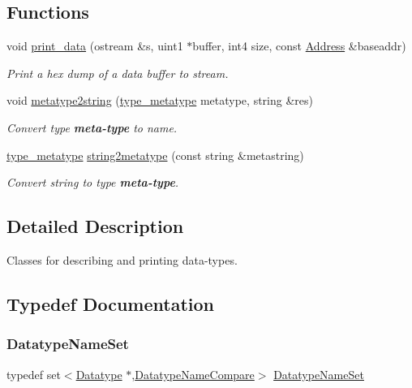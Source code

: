 \subsection*{Functions}
\begin{DoxyCompactItemize}
\item 
void \mbox{\hyperlink{type_8hh_a796dc3d5c66a81c95642a224e24ddb46}{print\+\_\+data}} (ostream \&s, uint1 $\ast$buffer, int4 size, const \mbox{\hyperlink{class_address}{Address}} \&baseaddr)
\begin{DoxyCompactList}\small\item\em Print a hex dump of a data buffer to stream. \end{DoxyCompactList}\item 
void \mbox{\hyperlink{type_8hh_ab61b3376ec08add3c7e899d703d5f34e}{metatype2string}} (\mbox{\hyperlink{type_8hh_aef6429f2523cdf4d415ba04a0209e61f}{type\+\_\+metatype}} metatype, string \&res)
\begin{DoxyCompactList}\small\item\em Convert type {\bfseries{meta-\/type}} to name. \end{DoxyCompactList}\item 
\mbox{\hyperlink{type_8hh_aef6429f2523cdf4d415ba04a0209e61f}{type\+\_\+metatype}} \mbox{\hyperlink{type_8hh_ae2f04f32a572d784b4c46f6745239c42}{string2metatype}} (const string \&metastring)
\begin{DoxyCompactList}\small\item\em Convert string to type {\bfseries{meta-\/type}}. \end{DoxyCompactList}\end{DoxyCompactItemize}


\subsection{Detailed Description}
Classes for describing and printing data-\/types. 



\subsection{Typedef Documentation}
\mbox{\label{type_8hh_aa1db0a143363e2b1d1150e3f2168c3ea}} 
\subsubsection{\texorpdfstring{DatatypeNameSet}{DatatypeNameSet}}
{\footnotesize\ttfamily typedef set$<$\mbox{\hyperlink{class_datatype}{Datatype}} $\ast$,\mbox{\hyperlink{struct_datatype_name_compare}{Datatype\+Name\+Compare}}$>$ \mbox{\hyperlink{type_8hh_aa1db0a143363e2b1d1150e3f2168c3ea}{Datatype\+Name\+Set}}}



